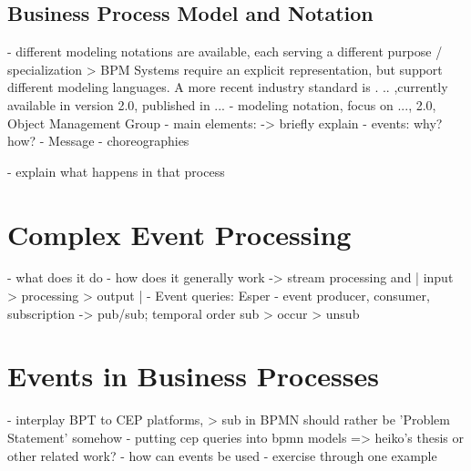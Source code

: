\subsection{Business Process Model and Notation}
- different modeling notations are available, each serving a different purpose / specialization
> BPM Systems require an explicit representation, but support different modeling languages. A more recent industry standard is . .. ,currently available in version 2.0, published in ...
- modeling notation, focus on ..., 2.0, Object Management Group
- main elements:
-> briefly explain
- events: why? how?
- Message
- choreographies


- explain what happens in that process

\section{Complex Event Processing}
- what does it do
- how does it generally work
-> stream processing and | input > processing > output |
- Event queries: Esper
- event producer, consumer, subscription
-> pub/sub; temporal order sub > occur > unsub


\section{Events in Business Processes}
- interplay BPT to CEP platforms, 
> sub in BPMN should rather be 'Problem Statement' somehow
- putting cep queries into bpmn models => heiko's thesis or other related work?
- how can events be used
- exercise through one example



